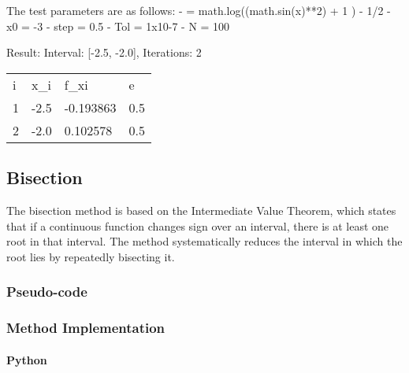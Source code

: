 \documentclass{article}
\begin{document}
The test parameters are as follows:
        - \textflorin = math.log((math.sin(x)**2) + 1 ) - 1/2
        - x0 = -3
        - step = 0.5
        - Tol = 1x10-7
        - N = 100

    Result:
        Interval: [-2.5, -2.0], Iterations: 2

        \begin{table}[ht]
        \begin{tabular}{llll}
        i & x\_i & f\_xi     & e   \\
        1 & -2.5 & -0.193863 & 0.5 \\
        2 & -2.0 & 0.102578  & 0.5
        \end{tabular}\label{tab:table}
        \end{table}

    \subsection{Bisection}\label{subsec:bisection}

    The bisection method is based on the Intermediate Value Theorem, which states that if a continuous function changes
    sign over an interval, there is at least one root in that interval. The method systematically reduces the interval
    in which the root lies by repeatedly bisecting it.

    \subsubsection{Pseudo-code}

    \subsubsection{Method Implementation}
    \paragraph{Python}
\end{document}
